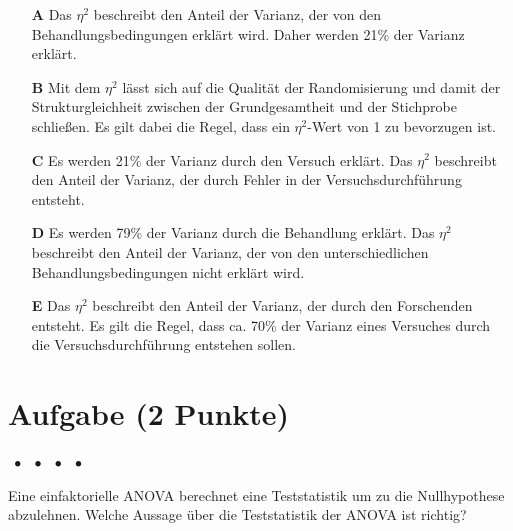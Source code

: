 \documentclass[a4paper, 9pt]{scrartcl}\usepackage[]{graphicx}\usepackage[]{xcolor}
\begin{document}
\begin{enumerate}
\item [\textbf{A} \msquare] Das $\eta^2$ beschreibt den Anteil der Varianz, der von den Behandlungsbedingungen erklärt wird. Daher werden 21\% der Varianz erklärt.
\item [\textbf{B} \msquare] Mit dem $\eta^2$ lässt sich auf die Qualität der Randomisierung und damit der Strukturgleichheit zwischen der Grundgesamtheit und der Stichprobe schließen. Es gilt dabei die Regel, dass ein $\eta^2$-Wert von 1 zu bevorzugen ist.
\item [\textbf{C} \msquare] Es werden 21\% der Varianz durch den Versuch erklärt. Das $\eta^2$ beschreibt den Anteil der Varianz, der durch Fehler in der Versuchsdurchführung entsteht.
\item [\textbf{D} \msquare] Es werden 79\% der Varianz durch die Behandlung erklärt. Das $\eta^2$ beschreibt den Anteil der Varianz, der von den unterschiedlichen Behandlungsbedingungen nicht erklärt wird.
\item [\textbf{E} \msquare] Das $\eta^2$ beschreibt den Anteil der Varianz, der durch den Forschenden entsteht. Es gilt die Regel, dass ca. 70\% der Varianz eines Versuches durch die Versuchsdurchführung entstehen sollen.
\end{enumerate}

\section{Aufgabe \hfill (2 Punkte)}

\ifcollection
\begin{flushright}
\tiny\vspace{-2Ex}
\textbf{\examinhaltstart}
\exammodulemathstat $\;\bullet$
\exammodulestat $\;\bullet$
\exammodulestatbbv $\;\bullet$
\exammodulestatversuch $\;\bullet$
\exammodulebiostat
\vspace{-1Ex}
\end{flushright}
\fi




Eine einfaktorielle ANOVA berechnet eine Teststatistik um zu die Nullhypothese abzulehnen. Welche Aussage über die Teststatistik der ANOVA ist richtig?
\end{document}
